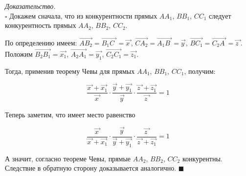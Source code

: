 \documentclass[14pt]{extarticle}
\let\Overrightarrow\overrightarrow
\let\vecarrow\overrightarrow
\theoremstyle{definition}
\theoremstyle{theorem}
\renewenvironment{proof}
    {\noindent \textit{Доказательство.}\\
	\indent $\square$}
	{ $\blacksquare$\\ }
\begin{document}
\begin{proof}
Докажем сначала, что из конкурентности прямых \(AA_1\), \(BB_1\), \(CC_1\)
следует конкурентность прямых \(AA_2\), \(BB_2\), \(CC_2\). 


По определению %
имеем: \(\vecarrow{AB_2} = \vecarrow{B_1C_{\: \,}} = 
\vecarrow{x_{\,}}\), \(\vecarrow{CA_2} = \vecarrow{A_1B_{\;}} = 
\vecarrow{y_{\,}}\), \(\vecarrow{BC_1} = \vecarrow{C_2A_{\:}} =
\vecarrow{z_{\, \,}}\).
Положим \(\Overrightarrow{B_2B_1} = \vecarrow{x_1}\), \(\Overrightarrow{A_2A_1}
 = \vecarrow{y_1}\), \(\Overrightarrow{C_2C_1} = \vecarrow{z_1}\).


\begin{figure}
    \vspace{-0.7cm}
	\vspace{-1cm}
\end{figure}


Тогда, применив теорему Чевы для прямых \(AA_1\), \(BB_1\), \(CC_1\),
получим:

\begin{ceqn}
\[
\frac{\vecarrow{x_{\,}} + \vecarrow{x_1}}{\vecarrow{x_{\,}}} \cdot
\frac{\vecarrow{y_{\,}} + \vecarrow{y_1}}{\vecarrow{y_{\,}}} \cdot
\frac{\vecarrow{z_{\, \,}} + \vecarrow{z_1}}{\vecarrow{z_{\, \,}}} 
= 1
\]
\end{ceqn}


Теперь заметим, что имеет место равенство 
\begin{ceqn}
\[
\frac{\vecarrow{x_{\,}}}{\vecarrow{x_{\,}} + \vecarrow{x_1}} \cdot
\frac{\vecarrow{y_{\,}}}{\vecarrow{y_{\,}} + \vecarrow{y_1}} \cdot
\frac{\vecarrow{z_{\, \,}}}{\vecarrow{z_{\, \,}} + \vecarrow{z_1}} 
= 1
\]
\end{ceqn}

А значит, согласно теореме Чевы, прямые \(AA_2\), \(BB_2\), \(CC_2\) конкурентны.
Следствие в обратную сторону доказывается аналогично.
\end{proof}
\end{document}
